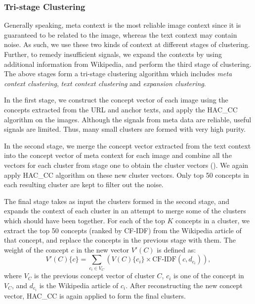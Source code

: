 \subsubsection{Tri-stage Clustering}
Generally speaking, meta context is the most reliable image context
since it is guaranteed to be
related to the image, whereas the text context may contain noise.
As such, we use these two kinds of context at different stages
of clustering. Further, to remedy insufficient signals,
we expand the contexts by using additional information from Wikipedia,
and perform the third stage of clustering.
The above stages form a tri-stage clustering algorithm
which includes {\em meta context clustering}, {\em text context clustering} and
{\em expansion clustering}.

In the first stage, we construct the concept vector of each image
using the concepts extracted from the URL and anchor texts,
and apply the HAC\_CC algorithm on the images. Although the signals
from meta data are reliable, useful signals are limited.
Thus, many small clusters are formed with very high purity.

In the second stage, we merge the concept vector extracted from the text context
into the concept vector of meta context for each image and combine
all the vectors for each cluster from stage one to obtain the cluster vectors
().
We again apply HAC\_CC algorithm on these new cluster vectors.
Only top 50 concepts in each resulting cluster are kept to filter out
the noise.

The final stage takes as input the clusters formed in the second stage,
and expands the context of each cluster in an attempt to merge
some of the clusters which should have been together.
For each of the top $K$ concepts in a cluster, we extract the top 50 concepts
(ranked by CF-IDF) from the Wikipedia article of that concept, and replace
the concepts in the previous stage with them.
The weight of the concept $c$ in the new vector $V'(C)$ is defined as:
\begin{equation}
\label{expv}
V'(C)\{c\}=\sum_{c_i\in V_C}\left({V(C)\{c_i\} \times \mbox{CF-IDF}(c, d_{c_i})}\right),
\end{equation}
where $V_C$ is the previous concept vector of cluster $C$,
$c_i$ is one of the concept in $V_C$, and $d_{c_i}$ is the Wikipedia
article of $c_i$.  After reconstructing the new concept vector,
HAC\_CC is again applied to form the final clusters.

